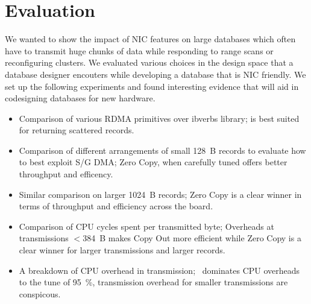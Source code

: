 \section{Evaluation}
We wanted to show the impact of NIC features on large databases which often have to 
transmit huge chunks of data while responding to range scans or reconfiguring clusters. 
We evaluated various choices in the design space that a database designer encouters while developing 
a database that is NIC friendly. We set up the following experiments and found interesting 
evidence that will aid in codesigning databases for new hardware.
\begin{itemize}
\item Comparison of various RDMA primitives over ibverbs library;  is best suited for returning scattered records.
\item Comparison of different arrangements of small 128~B records to evaluate how to best exploit S/G DMA; Zero Copy, when carefully tuned offers better throughput and efficency.
\item Similar comparison on larger 1024~B records; Zero Copy is a clear winner in terms of throughput and efficiency across the board.
\item Comparison of CPU cycles spent per transmitted byte; Overheads at transmissions $<$384~B makes Copy Out more efficient while Zero Copy is a clear winner for larger transmissions and larger records.
\item A breakdown of CPU overhead in transmission; \memcpy ~dominates CPU overheads to the tune of 95~\%, transmission overhead for smaller transmissions are conspicous.
\end{itemize}





